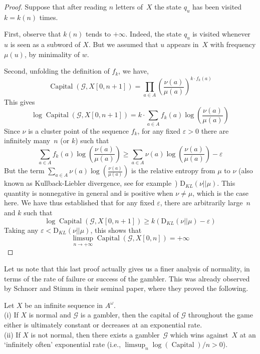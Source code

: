 \documentclass[11pt]{article}
\newcommand{\G}{\mathcal{G}}
\DeclareMathOperator{\capital}{Capital}
\begin{document}
\begin{proof}
Suppose that after reading $n$ letters of~$X$ the state $q_u$ has been visited~$k=k(n)$ times. 

First, observe that $k(n)$ tends to $+\infty$. Indeed, the state $q_u$ is visited whenever $u$ is seen as a subword of $X$. But we assumed that $u$ appears in~$X$ with frequency $\mu(u)$, by minimality of $w$. 


Second, unfolding the definition of $f_k$, we have,
\[
\capital(\G,X[0,n+1]) = \prod_{a \in A} \left( \frac{\nu(a)}{\mu(a)} \right)^{k \cdot f_k(a)}
\] 
This gives
\[
\log \capital(\G,X[0,n+1])= k \cdot \sum_{a \in A} f_k(a) \log \left( \frac{\nu(a)}{\mu(a)} \right)
\]
Since $\nu$ is a cluster point of the sequence $f_k$, for any fixed $\varepsilon>0$ there are infinitely many~$n$ (or $k$) such that
\[
\sum_{a \in A} f_k(a) \log \left( \frac{\nu(a)}{\mu(a)} \right) \geq \sum_{a \in A} \nu(a) \log \left( \frac{\nu(a)}{\mu(a)} \right)  - \varepsilon
\]
But the term $\sum_{a \in A} \nu(a) \log \left( \frac{\nu(a)}{\mu(a)} \right)$ is the relative entropy from $\mu$ to $\nu$ (also known as Kullback-Liebler divergence, see for example~\cite{CoverT2006}) $\mathrm{D}_{KL}(\nu || \mu)$. This quantity is nonnegative in general and is positive when $\nu \not= \mu$, which is the case here. We have thus established that for any fixed $\varepsilon$, there are arbitrarily large~$n$ and $k$ such that 
\[
\log \capital(\G,X[0,n+1]) \geq k \left( \mathrm{D}_{KL}(\nu || \mu) - \varepsilon \right)
\]
Taking any $\varepsilon < \mathrm{D}_{KL}(\nu || \mu)$, this shows that 
\[
\limsup_{n \rightarrow +\infty} \capital(\G,X[0,n]) = +\infty
\]


\end{proof}



Let us note that this last proof actually gives us a finer analysis of normality, in terms of the rate of failure or success of the gambler. This was already observed by Schnorr and Stimm in their seminal paper, where they proved the following.

\begin{theorem}
Let $X$ be an infinite sequence in $A^\omega$. \\
(i) If $X$ is normal and $\G$ is a gambler, then the capital of $\G$ throughout the game either is ultimately constant or decreases at an exponential rate.\\
(ii) If $X$ is not normal, then there exists a gambler~$\G$ which wins against~$X$ at an `infinitely often' exponential rate (i.e., $\limsup_n \log(\capital)/n >0$). 
\end{theorem}
\end{document}
